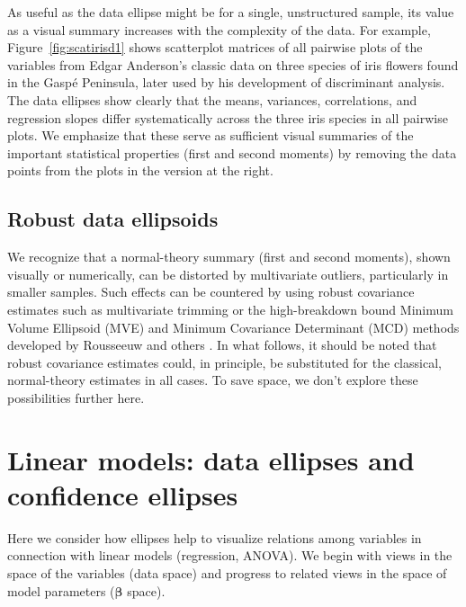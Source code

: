 \documentclass[11pt]{article}%
\newcommand*{\figref}[1]{Figure~\ref{#1}}
\renewcommand*{\vec}[1]{\ensuremath{\bm{#1}}}
\begin{document}
As useful as the data ellipse might be for a single, unstructured
sample, its value as a visual summary increases
with the complexity of the data.
For example, \figref{fig:scatirisd1} shows  scatterplot matrices
of all pairwise plots of the variables from Edgar Anderson's \citeyear{Anderson:35}
classic
data on three species of iris flowers found in the Gasp\'{e} Peninsula,
later used by \citet{Fisher:36} his development of discriminant analysis.
The data ellipses show clearly that the means, variances, correlations,
and regression slopes differ systematically across the three iris species
in all pairwise plots.  
We emphasize that these serve as sufficient visual summaries of the important
statistical properties (first and second moments) by removing the data points
from the plots in the version at the right.

\subsection{Robust data ellipsoids}
We recognize that a normal-theory summary (first and second moments),
shown visually or numerically, can be distorted
by multivariate outliers, particularly in smaller samples.
Such effects can be countered by using
robust covariance
estimates such as multivariate trimming \citep{GnanadesikanKettenring:72}
or the high-breakdown bound Minimum Volume Ellipsoid (MVE) and
Minimum Covariance Determinant (MCD) methods
developed by Rousseeuw and others
\citep{RousseeuwLeroy:87,RousseeuwVanDriessen:99}.
In what follows, it should be noted that
robust covariance estimates could, in principle, be substituted
for the classical, normal-theory estimates in all cases.
To save space, we don't explore these possibilities further here.



\section{Linear models: data ellipses and confidence ellipses}
Here we consider how ellipses help to visualize relations among variables
in connection with linear models (regression, ANOVA).
We begin with views in the space of the variables (data space)
and progress to related views in the space of model parameters
($\vec{\beta}$ space).

\end{document}
